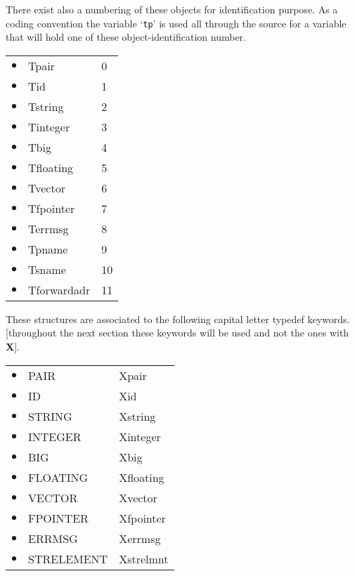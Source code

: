 There exist also a numbering of these objects for  identification  purpose.
As a  coding convention the variable `{\tt tp}' is used  all  through
the source for a variable that will hold one of these object-identification
number.
\vspace*{5ex}\\ \hspace*{5ex}
\begin{tabular}{rll}
   $\bullet$ &   Tpair      &    0  \\
   $\bullet$ &   Tid        &    1  \\
   $\bullet$ &   Tstring    &    2  \\
   $\bullet$ &   Tinteger   &    3  \\
   $\bullet$ &   Tbig       &    4  \\
   $\bullet$ &   Tfloating  &    5  \\
   $\bullet$ &   Tvector    &    6  \\
   $\bullet$ &   Tfpointer  &    7  \\
   $\bullet$ &   Terrmsg    &    8  \\
   $\bullet$ &   Tpname     &    9  \\
   $\bullet$ &   Tsname     &   10  \\
   $\bullet$ &   Tforwardadr&   11  \\
\end{tabular}
\vspace*{5ex}

These  structures  are  associated  to the following capital letter typedef
keywords.
[throughout the next section  these  keywords  will  be
used  and not the ones with {\bf X}].
\vspace*{5ex}\\ \hspace*{5ex}
\begin{tabular}{rll}
   $\bullet$ & PAIR       & Xpair \\
   $\bullet$ & ID         & Xid \\
   $\bullet$ & STRING     &  Xstring  \\
   $\bullet$ & INTEGER    &  Xinteger  \\
   $\bullet$ & BIG        & Xbig \\
   $\bullet$ & FLOATING   & Xfloating \\
   $\bullet$ & VECTOR     & Xvector \\
   $\bullet$ & FPOINTER   & Xfpointer \\
   $\bullet$ & ERRMSG     & Xerrmsg \\
   $\bullet$ & STRELEMENT & Xstrelmnt
\end{tabular}
\vspace*{5ex}

